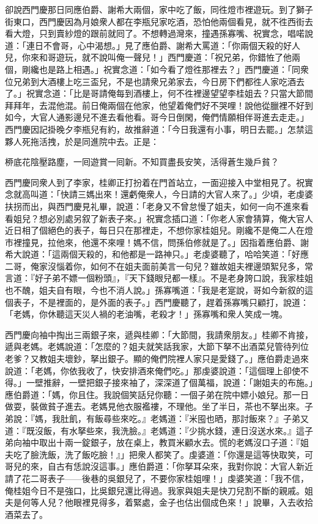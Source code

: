 卻說西門慶那日同應伯爵、謝希大兩個，{}家中吃了飯，同徃燈市裡遊玩。到了獅子街東口，西門慶因為月娘衆人都在李瓶兒家吃酒，恐怕他兩個看見，就不徃西街去看大燈，只到賣紗燈的跟前就囘了。不想轉過灣來，撞遇孫寡嘴、祝實念，唱喏說道：「連日不會哥，心中渴想。」見了應伯爵、謝希大罵道：「你兩個天殺的好人兒，你來和哥遊玩，就不說叫俺一聲兒！」西門慶道：「祝兄弟，你錯恠了他兩個，剛纔也是路上相遇。」祝實念道：「如今看了燈徃那裡去？」西門慶道：「同衆位兄弟到大酒樓上吃三盃兒，不是也請衆兄弟家去，今日房下們都徃人家吃酒去了。」祝實念道：「比是哥請俺每到酒樓上，何不徃裡邊望望李桂姐去？只當大節間拜拜年，去混他混。前日俺兩個在他家，他望着俺們好不哭哩！說他從臘裡不好到如今，大官人通影邊兒不進去看他看。哥今日倒閑，俺們情願相伴哥進去走走。」西門慶因記掛晚夕李瓶兒有約，故推辭道：「今日我還有小事，明日去罷。」怎禁這夥人死拖活拽，於是同進院中去。正是：

桺底花陰壓路塵，一囘遊賞一囘新。不知買盡長安笑，活得蒼生幾戶貧？

西門慶同衆人到了李家，桂卿正打扮着在門首站立，一面迎接入中堂相見了。祝實念就高叫道：{}「快請三媽出來！還虧俺衆人，今日請的大官人來了。」少頃，老虔婆扶拐而出，與西門慶見礼畢，說道：「老身又不曾怠慢了姐夫，如何一向不進來看看姐兒？想必別處另叙了新表子來。」祝實念插口道：「你老人家會猜算，俺大官人近日相了個絕色的表子，每日只在那裡走，不想你家桂姐兒。剛纔不是俺二人在燈市裡撞見，拉他來，他還不來哩！媽不信，問孫伯修就是了。」因指着應伯爵、謝希大說道：「這兩個天殺的，和他都是一路神只。」老虔婆聽了，哈哈笑道：「好應二哥，俺家沒惱着你，如何不在姐夫面前美言一句兒？雖故姐夫裡邊頭絮兒多，常言道：『好子弟不嫖一個粉頭』，『天下錢眼兒都一樣』。{}不是老身誇口說，我家桂姐也不醜，姐夫自有眼，今也不消人說。」孫寡嘴道：「我是老寔說，哥如今新叙的這個表子，不是裡面的，是外面的表子。」{}西門慶聽了，趕着孫寡嘴只顧打，說道：「老媽，你休聽這天災人禍的老油嘴，老殺才！」孫寡嘴和衆人笑成一塊。

西門慶向袖中掏出三兩銀子來，遞與桂卿：「大節間，我請衆朋友。」桂卿不肯接，遞與老媽。老媽說道：「怎麼的？姐夫就笑話我家，大節下拏不出酒菜兒管待列位老爹？又教姐夫壞鈔，拏出銀子。顯的俺們院裡人家只是愛錢了。」應伯爵走過來說道：「老媽，你依我收了，快安排酒來俺們吃。」那虔婆說道：「這個理上卻使不得。」一壁推辭，一壁把銀子接來袖了，深深道了個萬福，說道：「謝姐夫的布施。」{}應伯爵道：「媽，你且住。我說個笑話兒你聽：{}一個子弟在院中嫖小娘兒。那一日做耍，裝做貧子進去。老媽見他衣服襤褸，不理他。坐了半日，茶也不拏出來。子弟說：『媽，我肚飢，有飯尋些來吃。』老媽道：『米囤也晒，那討飯來？』子弟又道：『既沒飯，有水拏些來，我洗臉。』老媽道：『少挑水錢，連日沒送水來。』這子弟向袖中取出十兩一錠銀子，放在桌上，教買米顧水去。慌的老媽沒口子道：『姐夫吃了臉洗飯，洗了飯吃臉！』」把衆人都笑了。虔婆道：「你還是這等快取笑，可哥兒的來，自古有恁說沒這事。」{}應伯爵道：「你拏耳朵來，我對你說：大官人新近請了花二哥表子——{}後巷的吳銀兒了，不要你家桂姐哩！」虔婆笑道：「我不信，俺桂姐今日不是強口，比吳銀兒還比得過。我家與姐夫是快刀兒割不斷的親戚。{}姐夫是何等人兒？他眼裡見得多，着緊處，金子也估出個成色來！」說畢，入去收拾酒菜去了。


